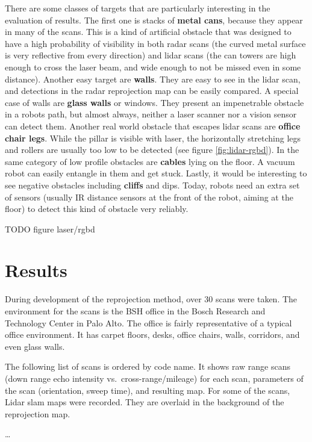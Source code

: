 There are some classes of targets that are particularly interesting in the evaluation of results. The first one is stacks of \textbf{metal cans}, because they appear in many of the scans. This is a kind of artificial obstacle that was designed to have a high probability of visibility in both radar scans (the curved metal surface is very reflective from every direction) and lidar scans (the can towers are high enough to cross the laser beam, and wide enough to not be missed even in some distance). Another easy target are \textbf{walls}. They are easy to see in the lidar scan, and detections in the radar reprojection map can be easily compared. A special case of walls are \textbf{glass walls} or windows. They present an impenetrable obstacle in a robots path, but almost always, neither a laser scanner nor a vision sensor can detect them. Another real world obstacle that escapes lidar scans are \textbf{office chair legs}. While the pillar is visible with laser, the horizontally stretching legs and rollers are usually too low to be detected (see figure \cref{fig:lidar-rgbd}). In the same category of low profile obstacles are \textbf{cables} lying on the floor. A vacuum robot can easily entangle in them and get stuck. Lastly, it would be interesting to see negative obstacles including \textbf{cliffs} and dips. Today, robots need an extra set of sensors (usually IR distance sensors at the front of the robot, aiming at the floor) to detect this kind of obstacle very reliably.

TODO figure laser/rgbd

\section{Results}\label{results}

During development of the reprojection method, over 30 scans were taken.
The environment for the scans is the BSH office in the Bosch Research
and Technology Center in Palo Alto. The office is fairly representative
of a typical office environment. It has carpet floors, desks, office
chairs, walls, corridors, and even glass walls.

The following list of scans is ordered by code name. It shows raw range
scans (down range echo intensity vs.~cross-range/mileage) for each scan,
parameters of the scan (orientation, sweep time), and resulting map. For
some of the scans, Lidar slam maps were recorded. They are overlaid in
the background of the reprojection map.

\ldots{}